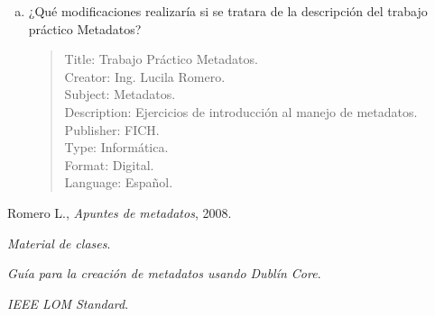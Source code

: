 \documentclass[a4paper,12pt,oneside,final,spanish]{article}
\begin{document}
\begin{enumerate}[a.]
\item ¿Qué modificaciones realizaría si se tratara de la descripción del trabajo práctico Metadatos? 

\begin{quote}
Title: Trabajo Práctico Metadatos.\\
Creator: Ing. Lucila Romero.\\
Subject: Metadatos.\\
Description: Ejercicios de introducción al manejo de metadatos.\\
Publisher: FICH.\\
Type: Informática.\\ 
Format: Digital. \\
Language: Español. 
\end{quote}

\end{enumerate}

\begin{thebibliography}{1}
Romero L.,
\emph{Apuntes de metadatos},
2008.

\emph{Material de clases}.

\emph{Guía para la creación de metadatos usando Dublín Core}.

\emph{IEEE LOM Standard}.
\end{thebibliography}
\end{document}
